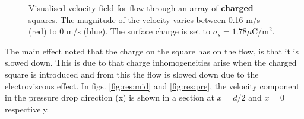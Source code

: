 \begin{figure}
  \centering
  \hspace{5pt} 
  \caption[Velocity field for flow through an array of
    charged squares.]{Visualised velocity field for flow
    through an array of \textbf{charged} squares. The magnitude of
    the velocity varies between 0.16 m/s (red) to 0 m/s (blue). The
    surface charge is set to $\sigma_s = 1.78 \mu$C/m$^2$.}
  \label{fig:res:s_charged}
\end{figure}

The main effect noted that the charge on the square has on the flow,
is that it is slowed down. This is due to that charge inhomogeneities
arise when the charged square is introduced and from this the flow is
slowed down due to the electroviscous effect. In
figs. \ref{fig:res:mid} and \ref{fig:res:pre}, the velocity component
in the pressure drop direction (x) is shown in a section at $x = d/2$
and $x = 0$ respectively.  

